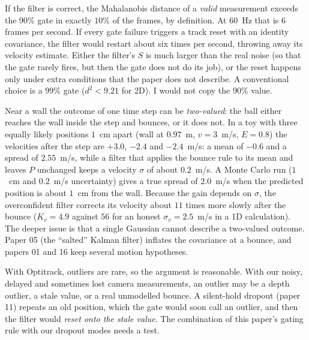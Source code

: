 \documentclass[11pt,a4paper]{article}
\begin{document}
\begin{warn}
If the filter is correct, the Mahalanobis distance of a \emph{valid} measurement exceeds the 90\%
gate in exactly $10\%$ of the frames, by definition. At $60$~Hz that is $6$ frames per second. If
every gate failure triggers a track reset with an identity covariance, the filter would restart
about six times per second, throwing away its velocity estimate. Either the filter's $S$ is much
larger than the real noise (so that the gate rarely fires, but then the gate does not do its job),
or the reset happens only under extra conditions that the paper does not describe. A
conventional choice is a $99\%$ gate ($d^2<9.21$ for 2D). I would not copy the 90\% value.
\end{warn}

\begin{warn}
Near a wall the outcome of one time step can be \emph{two-valued}: the ball either reaches the wall
inside the step and bounces, or it does not. In a toy with three equally likely positions $1$~cm
apart (wall at $0.97$~m, $v=3$~m/s, $E=0.8$) the velocities after the step are $+3.0$, $-2.4$ and
$-2.4$~m/s: a mean of $-0.6$ and a spread of $2.55$~m/s, while a filter that applies the bounce
rule to its mean and leaves $P$ unchanged keeps a velocity $\sigma$ of about $0.2$~m/s. A Monte
Carlo run ($1$~cm and $0.2$~m/s uncertainty) gives a true spread of $2.0$~m/s when the predicted
position is about $1$~cm from the wall. Because the gain depends on $\sigma$, the overconfident
filter corrects its velocity about $11$ times more slowly after the bounce ($K_v=4.9$ against $56$
for an honest $\sigma_v=2.5$~m/s in a 1D calculation). The deeper issue is that a single Gaussian
cannot describe a two-valued outcome. Paper 05 (the ``salted'' Kalman filter) inflates the
covariance at a bounce, and papers 01 and 16 keep several motion hypotheses.
\end{warn}

\begin{warn}
With Optitrack, outliers are rare, so the argument is reasonable. With our noisy, delayed and
sometimes lost camera measurements, an outlier may be a depth outlier, a stale value, or a real
unmodelled bounce. A silent-hold dropout (paper 11) repeats an old position, which the gate would
soon call an outlier, and then the filter would \emph{reset onto the stale value}. The combination
of this paper's gating rule with our dropout modes needs a test.
\end{warn}
\end{document}
